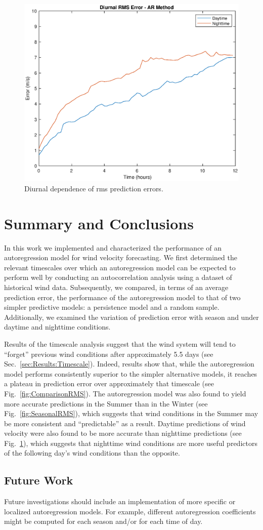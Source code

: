 \documentclass[11pt, oneside]{article}
\newcommand{\figref}[1]{Fig.~\ref{#1}}
\newcommand{\secref}[1]{Sec.~\ref{#1}}
\begin{document}
\begin{figure}[htb]
\centering
\includegraphics[width=\columnwidth]{figures/DiurnalRMSPredictionError}
\caption{Diurnal dependence of rms prediction errors.}
\label{fig:DiurnalRMS}
\end{figure}

\section{Summary and Conclusions}\label{sec:Conclusions}
In this work we implemented and characterized the performance of an autoregression model for wind velocity forecasting.
We first determined the relevant timescales over which an autoregression model can be expected to perform well by conducting an autocorrelation analysis using a dataset of historical wind data.
Subsequently, we compared, in terms of an average prediction error, the performance of the autoregression model to that of two simpler predictive models: a persistence model and a random sample.
Additionally, we examined the variation of prediction error with season and under daytime and nighttime conditions.

Results of the timescale analysis suggest that the wind system will tend to ``forget'' previous wind conditions after approximately 5.5 days (see \secref{sec:Results:Timescale}).
Indeed, results show that, while the autoregression model performs consistently superior to the simpler alternative models, it reaches a plateau in prediction error over approximately that timescale (see \figref{fig:ComparisonRMS}).
The autoregression model was also found to yield more accurate predictions in the Summer than in the Winter (see \figref{fig:SeasonalRMS}), which suggests that wind conditions in the Summer may be more consistent and ``predictable'' as a result.
Daytime predictions of wind velocity were also found to be more accurate than nighttime predictions (see \figref{fig:DiurnalRMS}), which suggests that nighttime wind conditions are more useful predictors of the following day's wind conditions than the opposite.

\subsection{Future Work}
Future investigations should include an implementation of more specific or localized autoregression models.
For example, different autoregression coefficients might be computed for each season and/or for each time of day.



\end{document}
